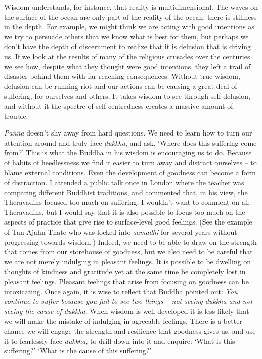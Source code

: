 Wisdom understands, for instance, that reality is multidimensional. The
waves on the surface of the ocean are only part of the reality of the
ocean: there is stillness in the depth. For example, we might think we
are acting with good intentions as we try to persuade others that we
know what is best for them, but perhaps we don't have the depth of
discernment to realize that it is delusion that is driving us. If we
look at the results of many of the religious crusades over the centuries
we see how, despite what they thought were good intentions, they left a
trail of disaster behind them with far-reaching consequences. Without
true wisdom, delusion can be running riot and our actions can be causing
a great deal of suffering, for ourselves and others. It takes wisdom to
see through self-delusion, and without it the spectre of
self-centredness creates a massive amount of trouble.

\emph{Pañña} doesn't shy away from hard questions. We need to learn how
to turn our attention around and truly face \emph{dukkha}, and ask,
`Where does this suffering come from?' This is what the Buddha in his
wisdom is encouraging us to do. Because of habits of heedlessness we
find it easier to turn away and distract ourselves -- to blame external
conditions. Even the development of goodness can become a form of
distraction. I attended a public talk once in London where the teacher
was comparing different Buddhist traditions, and commented that, in his
view, the Theravadins focused too much on suffering. I wouldn't want to
comment on all Theravadins, but I would say that it is also possible to
focus too much on the aspects of practice that give rise to
surface-level good feelings. (See the example of Tan Ajahn Thate who was
locked into \emph{samadhi} for several years without progressing towards
wisdom.) Indeed, we need to be able to draw on the strength that comes
from our storehouse of goodness, but we also need to be careful that we
are not merely indulging in pleasant feelings. It is possible to be
dwelling on thoughts of kindness and gratitude yet at the same time be
completely lost in pleasant feelings. Pleasant feelings that arise from
focusing on goodness can be intoxicating. Once again, it is wise to
reflect that Buddha pointed out: \emph{You continue to suffer because
you fail to see two things -- not seeing dukkha and not seeing the cause
of dukkha}. When wisdom is well-developed it is less likely that we will
make the mistake of indulging in agreeable feelings. There is a better
chance we will engage the strength and resilience that goodness gives
us, and use it to fearlessly face \emph{dukkha}, to drill down into it
and enquire: `What is this suffering?' `What is the cause of this
suffering?'

